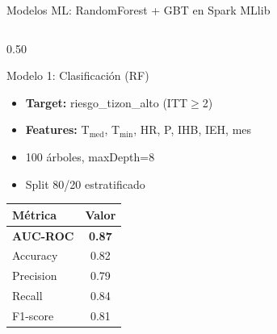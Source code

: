 \documentclass[14pt,aspectratio=169]{beamer}
\begin{document}
\begin{frame}[fragile]{Modelos ML: RandomForest + GBT en Spark MLlib}
  \begin{columns}[T]
    \begin{column}{0.50\textwidth}
      \begin{block}{Modelo 1: Clasificaci\'on (RF)}
        \begin{itemize}\footnotesize
          \item \textbf{Target:} riesgo\_tizon\_alto (ITT$\ge$2)
          \item \textbf{Features:} T$_{\text{med}}$, T$_{\min}$, HR,
            P, IHB, IEH, mes
          \item 100 \'arboles, maxDepth=8
          \item Split 80/20 estratificado
        \end{itemize}
      \end{block}
      \vspace{0.3em}
      \begin{tabular}{lc}
        \toprule
        M\'etrica & Valor \\
        \midrule
        \rowcolor{agroclear!70}\textbf{AUC-ROC} & \textbf{0.87} \\
        Accuracy & 0.82 \\
        Precision & 0.79 \\
        Recall & 0.84 \\
        F1-score & 0.81 \\
        \bottomrule
      \end{tabular}
    \end{column}


\end{columns}
\end{frame}
\end{document}
